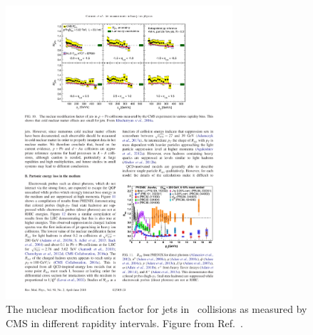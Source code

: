 \begin{figure}[htbp]
\begin{center}
\includegraphics[width=0.75\textwidth]{figures/theory/RpPb}
\caption{The nuclear modification factor for jets in \pPb\ collisions as measured by CMS in different rapidity intervals.
Figure from Ref.~\cite{Khachatryan2016b}.}
\label{fig:pAenergyDensity}
\end{center}
\end{figure}



